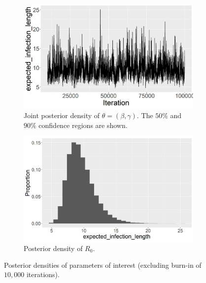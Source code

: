 \documentclass[11pt]{article}
\begin{document}
	\begin{figure}
		\centering
		\begin{subfigure}[b]{0.45\textwidth}
			\centering
			\includegraphics[width=\textwidth]{E5_expected_infection_length_tp}
			\caption{Joint posterior density of $\theta = (\beta, \gamma)$. The $50\%$ and $90\%$ confidence regions are shown.}
			\label{fig:density_joint}
		\end{subfigure}
		\hfill
		\begin{subfigure}[b]{0.49\textwidth}
			\centering
			\includegraphics[width=\textwidth]{E5_expected_infection_length_hist.jpg}
			\caption{Posterior density of $R_0$.}
			\label{fig:density_R0}
		\end{subfigure}
		\caption{Posterior densities of parameters of interest (excluding burn-in of $10,000$ iterations).}
		\label{fig:ebola}
	\end{figure}
	
\end{document}
